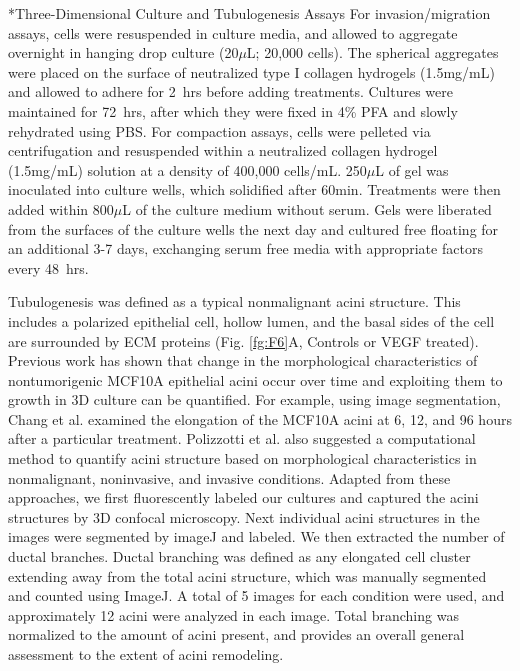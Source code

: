 \documentclass[12pt]{article}
\makeatletter
\renewcommand\subsubsection{\@startsection
	{subsubsection}{2}{0mm}
	{-0.05in}
	{-0.5\baselineskip}
	{\normalfont\normalsize\itshape}}
\makeatother
\begin{document}
\subsubsection*{Three-Dimensional Culture and Tubulogenesis Assays}
For invasion/migration assays, cells were resuspended in culture media, and allowed to aggregate overnight in hanging drop culture (20$\mu$L; 20,000 cells). The spherical aggregates were placed on the surface of neutralized type I collagen hydrogels (1.5mg/mL) and allowed to adhere for 2~hrs before adding treatments. Cultures were maintained for 72~hrs, after which they were fixed in 4\% PFA and slowly rehydrated using PBS. For compaction assays, cells were pelleted via centrifugation and resuspended within a neutralized collagen hydrogel (1.5mg/mL) solution at a density of 400,000 cells/mL.  250$\mu$L of gel was inoculated into culture wells, which solidified after 60min. Treatments were then added within 800$\mu$L of the culture medium without serum. Gels were liberated from the surfaces of the culture wells the next day and cultured free floating for an additional 3-7 days, exchanging serum free media with appropriate factors every 48~hrs.

Tubulogenesis was defined as a typical nonmalignant acini structure.
This includes a polarized epithelial cell, hollow lumen, and the basal sides of the cell are surrounded by ECM proteins (Fig. \ref{fg:F6}A, Controls or VEGF treated). Previous work has shown that change in the morphological
characteristics of nontumorigenic MCF10A epithelial acini occur over time and exploiting them to growth in 3D culture can be quantified.
For example, using image segmentation, Chang et al. \citep{ChangPP07} examined the elongation of the MCF10A acini at 6, 12, and 96 hours after a particular treatment.
Polizzotti et al. \citep{Polizzotti} also suggested a computational method to quantify acini structure based on morphological characteristics in nonmalignant, noninvasive, and invasive conditions.
Adapted from these approaches, we first fluorescently labeled our cultures and captured the acini structures by 3D confocal microscopy.
Next individual acini structures in the images were segmented by imageJ and labeled.
We then extracted the number of ductal branches. Ductal branching was defined as any elongated cell cluster extending away from the total acini structure, which was manually segmented and counted using ImageJ.
A total of 5 images for each condition were used, and approximately 12 acini were analyzed in each image.
Total branching was normalized to the amount of acini present, and provides an overall general assessment to the extent of acini remodeling.
\end{document}
